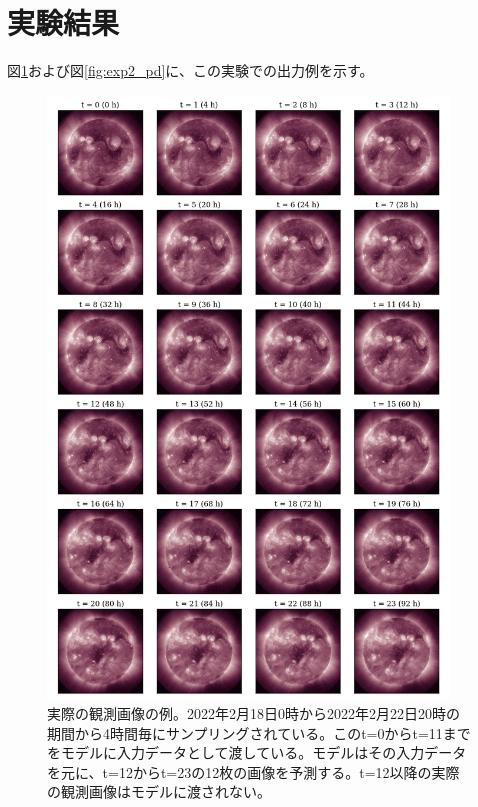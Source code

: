   \section{実験結果}
    図\ref{fig:exp2_gt}および図\ref{fig:exp2_pd}に、この実験での出力例を示す。
    \begin{figure}[htbp]
      \centering
      \includegraphics[width=0.95\textwidth]{figures/exp2/gt.png}
      \caption{実際の観測画像の例。2022年2月18日0時から2022年2月22日20時の期間から4時間毎にサンプリングされている。このt=0からt=11までをモデルに入力データとして渡している。モデルはその入力データを元に、t=12からt=23の12枚の画像を予測する。t=12以降の実際の観測画像はモデルに渡されない。}
      \label{fig:exp2_gt}
    \end{figure}
